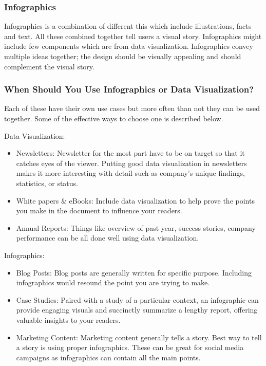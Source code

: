 \documentclass[]{book}
\providecommand{\tightlist}{%
  \setlength{\itemsep}{0pt}\setlength{\parskip}{0pt}}
\theoremstyle{definition}
\theoremstyle{definition}
\theoremstyle{definition}
\theoremstyle{remark}
\begin{document}
\subsubsection{Infographics}\label{infographics-1}

Infographics is a combination of different this which include
illustrations, facts and text. All these combined together tell users a
visual story. Infographics might include few components which are from
data visualization. Infographics convey multiple ideas together; the
design should be visually appealing and should complement the visual
story.

\subsubsection{When Should You Use Infographics or Data
Visualization?}\label{when-should-you-use-infographics-or-data-visualization}

Each of these have their own use cases but more often than not they can
be used together. Some of the effective ways to choose one is described
below.

Data Visualization:

\begin{itemize}
\tightlist
\item
  Newsletters: Newsletter for the most part have to be on target so that
  it catches eyes of the viewer. Putting good data visualization in
  newsletters makes it more interesting with detail such as company's
  unique findings, statistics, or status.
\item
  White papers \& eBooks: Include data visualization to help prove the
  points you make in the document to influence your readers.
\item
  Annual Reports: Things like overview of past year, success stories,
  company performance can be all done well using data visualization.
\end{itemize}

Infographics:

\begin{itemize}
\tightlist
\item
  Blog Posts: Blog posts are generally written for specific purpose.
  Including infographics would resound the point you are trying to make.
\item
  Case Studies: Paired with a study of a particular context, an
  infographic can provide engaging visuals and succinctly summarize a
  lengthy report, offering valuable insights to your readers.
\item
  Marketing Content: Marketing content generally tells a story. Best way
  to tell a story is using proper infographics. These can be great for
  social media campaigns as infographics can contain all the main
  points.
\end{itemize}
\end{document}
